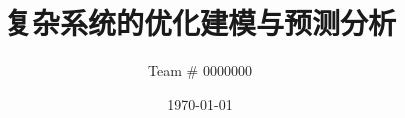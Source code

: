 \documentclass{mcmthesis} %
\title{复杂系统的优化建模与预测分析}
\author{Team \# 0000000}
\date{\today}
\theoremstyle{scplain}
\begin{document}
\begin{abstract}

\end{abstract}

\maketitle
\tableofcontents 
\newpage

















\newpage

\end{document}
